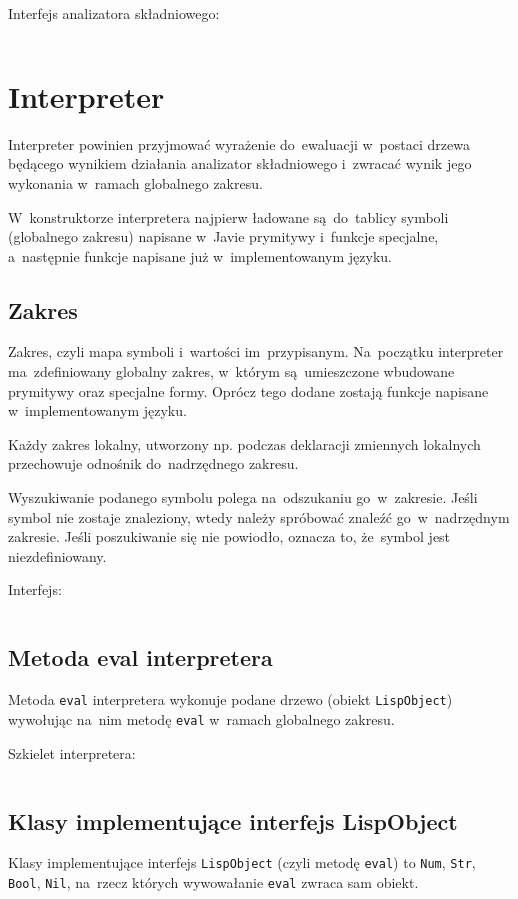 \documentclass[a4paper,11pt]{article}
\newcommand{\impl}[1]{
\inputminted[fontsize=\footnotesize,frame=single,samepage=true]{java}{impl/#1.java}
}
\begin{document}
Interfejs analizatora składniowego:
\impl{Parser}

\section{Interpreter}

Interpreter powinien przyjmować wyrażenie do~ewaluacji w~postaci drzewa
będącego wynikiem działania analizator składniowego i~zwracać wynik jego
wykonania w~ramach globalnego zakresu.

W~konstruktorze interpretera najpierw ładowane są~do~tablicy symboli
(globalnego zakresu) napisane w~Javie prymitywy i~funkcje specjalne,
a~następnie funkcje napisane już w~implementowanym języku.

\subsection{Zakres}

Zakres, czyli mapa symboli i~wartości im~przypisanym. Na~początku interpreter
ma~zdefiniowany globalny zakres, w~którym są~umieszczone wbudowane prymitywy
oraz specjalne formy. Oprócz tego dodane zostają funkcje napisane
w~implementowanym języku.

Każdy zakres lokalny, utworzony np. podczas deklaracji zmiennych lokalnych
przechowuje odnośnik do~nadrzędnego zakresu.

Wyszukiwanie podanego symbolu polega na~odszukaniu go~w~zakresie. Jeśli symbol
nie zostaje znaleziony, wtedy należy spróbować znaleźć go~w~nadrzędnym
zakresie. Jeśli poszukiwanie się nie powiodło, oznacza to, że~symbol jest
niezdefiniowany.

Interfejs:
\impl{Scope}

\subsection{Metoda eval interpretera}

Metoda \verb+eval+ interpretera wykonuje podane drzewo (obiekt
\verb+LispObject+) wywołując na~nim metodę \verb+eval+ w~ramach globalnego
zakresu.

Szkielet interpretera:
\impl{Interpreter}

\subsection{Klasy implementujące interfejs LispObject}

Klasy implementujące interfejs \verb+LispObject+ (czyli metodę \verb+eval+) to
\verb+Num+, \verb+Str+, \verb+Bool+, \verb+Nil+, na~rzecz których wywowałanie
\verb+eval+ zwraca sam obiekt.
\end{document}
